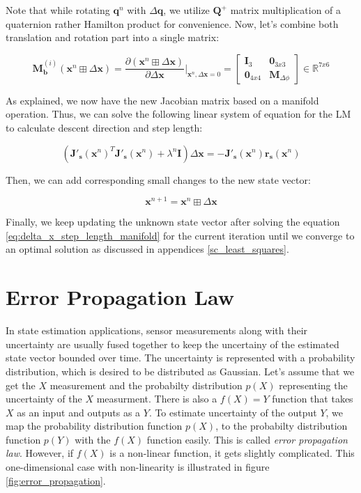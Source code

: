\documentclass[a4paper]{report}
\numberwithin{figure}{section}
\newcommand{\R}{\mathbb{R}}
\begin{document}
Note that while rotating $\mathbf{q}^n$ with $\Delta \mathbf{\mathbf{q}}$, 
we utilize $\mathbf{Q}^{+}$ matrix multiplication of a quaternion rather Hamilton product 
for convenience.
Now, let's combine both translation and rotation part into a single matrix:

\begin{equation}
\mathbf{M}_{\mathbf{b}}^{(i)}(\mathbf{x}^n \boxplus \Delta \mathbf{x}) = 
    \frac{\partial (\mathbf{x}^n \boxplus \Delta \mathbf{x})}
  {\partial \Delta \mathbf{x}} \bigg|_{\mathbf{x}^n,\Delta \mathbf{x}=0} = 
  \begin{bmatrix} 
  \mathbf{I}_3 & \mathbf{0}_{3x3} \\ 
  \mathbf{0}_{4x4} & \mathbf{M}_{\Delta \phi}   
  \end{bmatrix}
  \in \R^{7x6}
\end{equation}

As explained, we now have the new Jacobian matrix based on a manifold operation.
Thus, we can solve the following linear system of equation for the LM 
to calculate descent direction and step length:

\begin{equation}\label{eq:delta_x_step_length_manifold}
  (\mathbf{J'_s}(\mathbf{x}^n)^T\mathbf{J'_s}(\mathbf{x}^n) 
  + \lambda^n \mathbf{I})
  \Delta \mathbf{x} =  
  -\mathbf{J'_s}(\mathbf{x}^n)\mathbf{r_s}(\mathbf{x}^n)
\end{equation}

Then, we can add corresponding small changes to the new state vector:

\begin{equation}
  \mathbf{x}^{n+1} = \mathbf{x}^{n} \boxplus \Delta \mathbf{x}
\end{equation}

Finally, we keep updating the unknown state vector after solving 
the equation \eqref{eq:delta_x_step_length_manifold} for the current iteration 
until we converge to an optimal solution as discussed in appendices \ref{sc_least_squares}.

\section{Error Propagation Law} \label{sc_error_prop_law}

In state estimation applications, sensor measurements along with their uncertainty are 
usually fused together to keep the uncertainy of the estimated state vector bounded 
over time. 
The uncertainty is represented with a probability distribution, 
which is desired to be distributed as Gaussian. 
Let's assume that we get the $X$ measurement and the probabilty distribution 
$p(X)$ representing the uncertainty of the $X$ measurment. 
There is also a $f(X)=Y$ function that takes $X$ as an input and outputs 
as a $Y$. 
To estimate uncertainty of the output $Y$, 
we map the probability distribution function $p(X)$, 
to the probabilty distribution function $p(Y)$ with the $f(X)$ function easily.
This is called 
\textit{error propagation law}. However, if $f(X)$ is a non-linear function, 
it gets slightly complicated. This one-dimensional case with non-linearity is 
illustrated in figure \ref{fig:error_propagation}.
\end{document}
